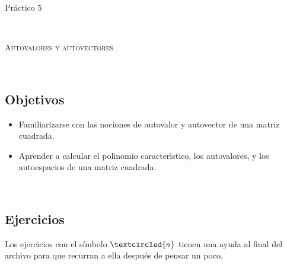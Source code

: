 \documentclass[12pt]{amsart}
\begin{document}
	
	
	\centerline{\Large{Pr\' actico 5}}
	
	\
	
	\centerline{\textsc{Autovalores y autovectores}}
	
	\
	
\subsection*{Objetivos}
	
\begin{itemize}
\item Familiarizarse con las nociones de autovalor y autovector de una matriz cuadrada.

\item Aprender a calcular el polinomio caracter\' \i stico, los autovalores, y los autoespacios de una matriz cuadrada.
\end{itemize}
	
	\
	
\subsection*{Ejercicios} Los ejercicios con el s\'imbolo $\textcircled{a}$ tienen una ayuda al final del archivo para que recurran a ella despu\'es de pensar un poco.

\
\end{document}
